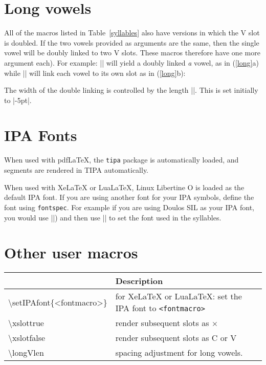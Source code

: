 \documentclass[11pt]{article}
\newcommand*\bs{\textbackslash}
\newcommand*{\pkg}[1]{\texttt{#1}\xspace}
\begin{document}
\section{Long vowels}
All of the macros listed in Table~{\ref{syllables}} also have versions in which the V slot is doubled. If the two vowels provided as arguments are the same, then the single vowel will be doubly linked to two V slots. These macros therefore have one more argument each). For example: || will yield a doubly linked \emph{a} vowel, as in (\ref{long}a)  while || will link each vowel to its own slot as in (\ref{long}b):

\begin{multicols}{2}
\begin{exe}
\ex\label{long}
\begin{xlist}
\ex {}
\ex {}
\end{xlist}
\end{exe}
\end{multicols}

The width of the double linking is controlled by the length |\longVlen|. This is set  initially to |-5pt|.

\section{IPA Fonts}
When used with pdfLaTeX, the \pkg{tipa} package is automatically loaded, and segments are rendered in TIPA automatically.

When used with XeLaTeX or LuaLaTeX, Linux Libertine O is loaded as the default IPA font. If you are using another font for your IPA symbols, define the font using \pkg{fontspec}.  For example if you are using Doulos SIL as your IPA font, you would use  |\newfontfamily{}|) and then use |\setIPAfont{\myipafont}| to set the font used in the syllables.

\section{Other user macros}
\begin{center}
\label{macros}
\medskip
\begin{tabularx}{.8\linewidth}{>{\ttfamily}lX}
\toprule
\multicolumn{1}{c}{Macro} & Description \\
\midrule
\bs setIPAfont\{<fontmacro>\} & for XeLaTeX or LuaLaTeX: set the IPA font to \texttt{<fontmacro>}\\
\bs xslottrue & render subsequent slots as $\times$\\
\bs xslotfalse & render subsequent slots as C or V\\
\bs longVlen & spacing adjustment for long vowels. \\
\bottomrule
\end{tabularx}
\end{center}
\clearpage
\end{document}
